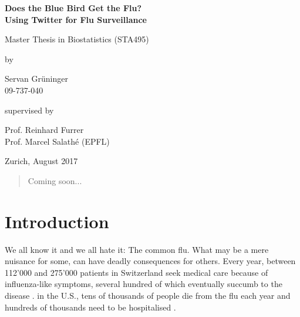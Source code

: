 \documentclass[11pt, a4paper,twoside]{report}\usepackage[]{graphicx}\usepackage[]{color}
\makeatletter
\renewcommand{\baselinestretch}{1.1}
\renewcommand\familydefault{\sfdefault}
\newcommand{\name}{Servan Grüninger}
\newcommand{\mail}{servan.grueninger@gmail.com}
\newcommand{\versiondate}{\today}
\newcommand{\supervisor}{Prof. Dr. Reinhard Furrer (UZH) \& Prof. Dr. Marcel Salathé (EPFL)}
\newcommand{\bigtitle}{Does the Blue Bird Get the Flu?}
\newcommand{\subtitle}{Using Twitter for Flu Surveillance}
\newcommand{\of}{of\xspace}
\newcommand{\HRule}{\rule{\linewidth}{0.5mm}}
\newcommand{\mytitle}[3]{
\begin{center}
\vspace*{-2.1cm}

\HRule

\vspace*{0.4cm}



\vspace*{0.4cm} \HRule

\bigskip

\textsf{\LARGE #1} \vspace*{0.5cm}

\Large{#2}

\medskip

\large{Author: \name \ (\textit{\mail})}

\medskip

\large{Supervision: \supervisor}

\medskip

Version \of \versiondate

\end{center}

\medskip
}
\makeatother
\begin{document}
\renewcommand{\baselinestretch}{1.5}\normalfont
\begin{center}
\setlength{\parindent}{0cm}
\bf\Large%
Does the Blue Bird Get the Flu?\\
Using Twitter for Flu Surveillance
\normalfont



\hrulefill

\vspace*{4cm}

\large
Master Thesis in Biostatistics (STA495)
\vspace*{12mm}

by

\vspace*{12mm}

Servan Grüninger\\
\small 09-737-040\\
\normalfont
\vspace*{4cm}

supervised by

\vspace*{1cm}

Prof. Reinhard Furrer\\
Prof. Marcel Salathé (EPFL)

\vfill

Zurich, August 2017
\end{center}
\renewcommand\familydefault{\rmdefault}\normalfont%
\setcounter{page}{0}
\thispagestyle{empty}
\cleardoublepage


\pagestyle{standard}


\begin{abstract}
Coming soon...
\end{abstract}

\thispagestyle{empty}
\cleardoublepage

\tableofcontents
\cleardoublepage


\chapter{Introduction}
\label{ch:intro}
\setcounter{page}{0}
We all know it and we all hate it: The common flu. What may be a mere nuisance for some, can have deadly consequences for others. Every year, between 112'000 and 275'000 patients in Switzerland seek medical care because of influenza-like symptoms, several hundred of which eventually succumb to the disease \citep{bag_lagebericht_2017}. in the U.S., tens of thousands of people die from the flu each year and hundreds of thousands need to be hospitalised \citep{rolfes_estimated_2016}.
\end{document}
